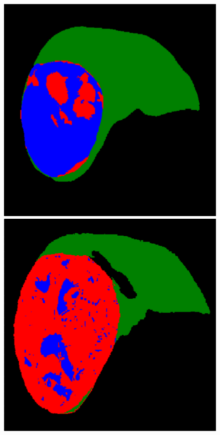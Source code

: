 \begin{figure}[!ht]
\begin{minipage}{4cm}
\end{minipage} \hspace{-0.3cm}
\begin{minipage}{4cm}
\includegraphics[width=\linewidth]{../SemanticSeg/images/5_2_gt_resized}
\end{minipage} \hspace{-0.3cm}
\begin{minipage}{4cm}
\includegraphics[width=\linewidth]{../SemanticSeg/images/5_8_gt_resized}

\end{minipage}
\end{figure}
